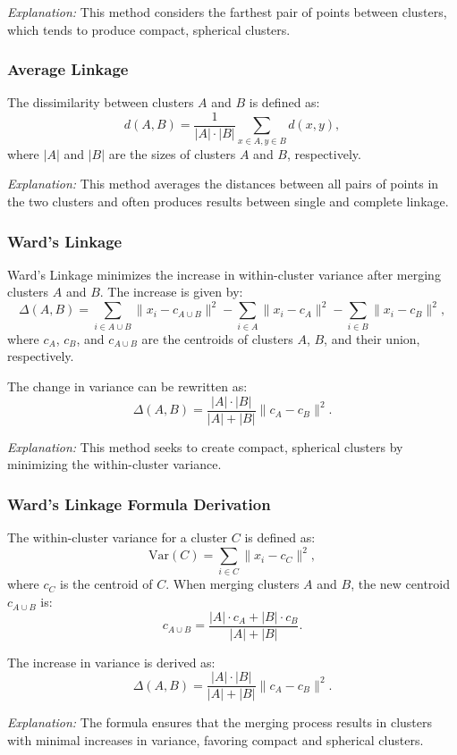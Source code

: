 \documentclass[12pt,a4paper]{article}
\begin{document}
\textit{Explanation:} This method considers the farthest pair of points between clusters, which tends to produce compact, spherical clusters.

\subsubsection{Average Linkage}
The dissimilarity between clusters $A$ and $B$ is defined as:
\[
d(A, B) = \frac{1}{|A| \cdot |B|} \sum_{x \in A, y \in B} d(x, y),
\]
where $|A|$ and $|B|$ are the sizes of clusters $A$ and $B$, respectively.

\textit{Explanation:} This method averages the distances between all pairs of points in the two clusters and often produces results between single and complete linkage.

\subsubsection{Ward’s Linkage}
Ward’s Linkage minimizes the increase in within-cluster variance after merging clusters $A$ and $B$. The increase is given by:
\[
\Delta(A, B) = \sum_{i \in A \cup B} \|x_i - c_{A \cup B}\|^2 - \sum_{i \in A} \|x_i - c_A\|^2 - \sum_{i \in B} \|x_i - c_B\|^2,
\]
where $c_A$, $c_B$, and $c_{A \cup B}$ are the centroids of clusters $A$, $B$, and their union, respectively.

The change in variance can be rewritten as:
\[
\Delta(A, B) = \frac{|A| \cdot |B|}{|A| + |B|} \|c_A - c_B\|^2.
\]

\textit{Explanation:} This method seeks to create compact, spherical clusters by minimizing the within-cluster variance.

\subsubsection{Ward’s Linkage Formula Derivation}
The within-cluster variance for a cluster $C$ is defined as:
\[
\text{Var}(C) = \sum_{i \in C} \|x_i - c_C\|^2,
\]
where $c_C$ is the centroid of $C$. When merging clusters $A$ and $B$, the new centroid $c_{A \cup B}$ is:
\[
c_{A \cup B} = \frac{|A| \cdot c_A + |B| \cdot c_B}{|A| + |B|}.
\]

The increase in variance is derived as:
\[
\Delta(A, B) = \frac{|A| \cdot |B|}{|A| + |B|} \|c_A - c_B\|^2.
\]

\textit{Explanation:} The formula ensures that the merging process results in clusters with minimal increases in variance, favoring compact and spherical clusters.
\end{document}

